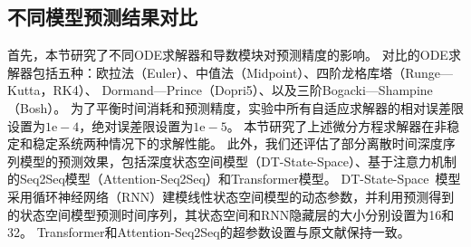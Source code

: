 \subsection{不同模型预测结果对比}
首先，本节研究了不同ODE求解器和导数模块对预测精度的影响。
对比的ODE求解器包括五种：欧拉法（Euler）、中值法（Midpoint）、四阶龙格库塔（Runge—Kutta，RK4）、 Dormand—Prince（Dopri5）\cite{chen2018neural}、以及三阶Bogacki—Shampine（Bosh）\cite{bogacki19893}。
为了平衡时间消耗和预测精度，实验中所有自适应求解器的相对误差限设置为$1\mathrm{e}-4$，绝对误差限设置为$1\mathrm{e}-5$。
本节研究了上述微分方程求解器在非稳定和稳定系统两种情况下的求解性能。
此外，我们还评估了部分离散时间深度序列模型的预测效果，包括深度状态空间模型（DT-State-Space）、基于注意力机制的Seq2Seq模型（Attention-Seq2Seq）\cite{Member2019}和Transformer模型\cite{Wu2020}。
DT-State-Space~\cite{Rangapuram2018}模型采用循环神经网络（RNN）建模线性状态空间模型的动态参数，并利用预测得到的状态空间模型预测时间序列，其状态空间和RNN隐藏层的大小分别设置为16和32。
Transformer和Attention-Seq2Seq的超参数设置与原文献保持一致。

